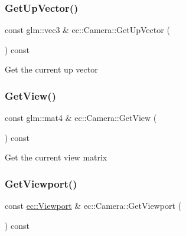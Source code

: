 \mbox{\label{classec_1_1_camera_a286e78e35fe712ee2d685e73a126617f}} 
\subsubsection{\texorpdfstring{Get\+Up\+Vector()}{GetUpVector()}}
{\footnotesize\ttfamily const glm\+::vec3 \& ec\+::\+Camera\+::\+Get\+Up\+Vector (\begin{DoxyParamCaption}{ }\end{DoxyParamCaption}) const}

Get the current up vector \mbox{\label{classec_1_1_camera_ad5ed2007c501081561fd8ee894f86ae0}} 
\subsubsection{\texorpdfstring{Get\+View()}{GetView()}}
{\footnotesize\ttfamily const glm\+::mat4 \& ec\+::\+Camera\+::\+Get\+View (\begin{DoxyParamCaption}{ }\end{DoxyParamCaption}) const}

Get the current view matrix \mbox{\label{classec_1_1_camera_a6997f9c09e6cf43b1e7440eb2af83eb2}} 
\subsubsection{\texorpdfstring{Get\+Viewport()}{GetViewport()}}
{\footnotesize\ttfamily const \mbox{\hyperlink{classec_1_1_viewport}{ec\+::\+Viewport}} \& ec\+::\+Camera\+::\+Get\+Viewport (\begin{DoxyParamCaption}{ }\end{DoxyParamCaption}) const}

\mbox{\label{classec_1_1_camera_a8d9b7b4944f32e685eef162f50a96d44}} 
